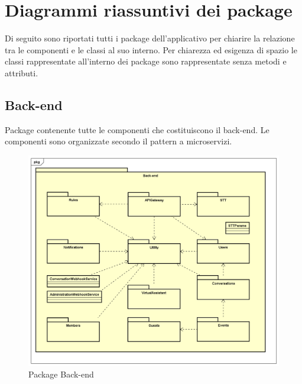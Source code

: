 \section{Diagrammi riassuntivi dei package}
Di seguito sono riportati tutti i package dell’applicativo per chiarire la relazione tra le componenti e le classi al suo interno. Per chiarezza ed esigenza di spazio le classi rappresentate all’interno dei package sono rappresentate senza metodi e attributi.


\subsection{Back-end}
Package contenente tutte le componenti che costituiscono il back-end. Le componenti sono organizzate secondo il pattern a microservizi.
\begin{figure}[h] \centering \includegraphics[width=\textwidth,height=\textheight,keepaspectratio]{images/diagrams/back-end/Official_Backend_0304/Back-end.png}
\caption{Package Back-end}
\end{figure}
\newpage

